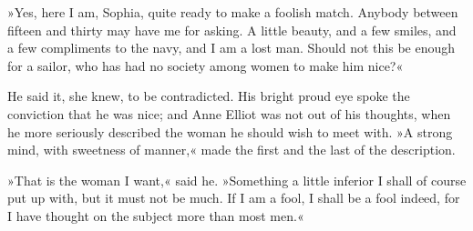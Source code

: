 »Yes, here I am, Sophia, quite ready to make a foolish match. Anybody between fifteen and thirty may have me for asking. A little beauty, and a few smiles, and a few compliments to the navy, and I am a lost man. Should not this be enough for a sailor, who has had no society among women to make him nice?«

He said it, she knew, to be contradicted. His bright proud eye spoke the conviction that he was nice; and Anne Elliot was not out of his thoughts, when he more seriously described the woman he should wish to meet with. »A strong mind, with sweetness of manner,« made the first and the last of the description.

»That is the woman I want,« said he. »Something a little inferior I shall of course put up with, but it must not be much. If I am a fool, I shall be a fool indeed, for I have thought on the subject more than most men.«